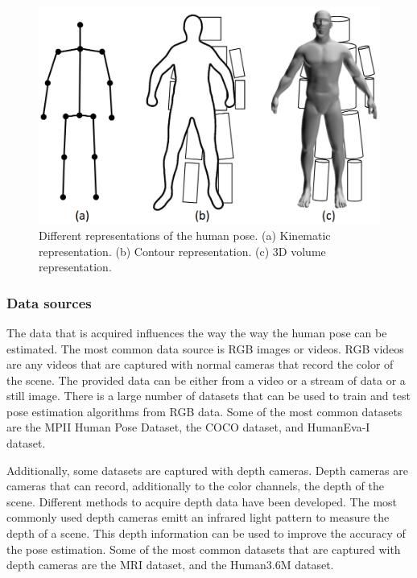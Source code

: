 \begin{figure}
    \centering
    \includegraphics[width=0.8\linewidth]{figures/HPE/PoseRepresentation.png}
    \caption[Different representations of the human pose]{Different representations of the human pose. (a) Kinematic representation. (b) Contour representation. (c) 3D volume representation. \cite{HPESurveyOriginal}}
    \label{fig:pose_representation}
\end{figure}

\subsubsection{Data sources}

The data that is acquired influences the way the way the human pose can be estimated. The most common data source is RGB images or videos. RGB videos are any videos that are captured with normal cameras that record the color of the scene. The provided data can be either from a video or a stream of data or a still image. There is a large number of datasets that can be used to train and test pose estimation algorithms from RGB data. Some of the most common datasets are the MPII Human Pose Dataset\cite{MPII}, the COCO dataset\cite{Coco}, and HumanEva-I dataset\cite{HumanEva}.

Additionally, some datasets are captured with depth cameras. Depth cameras are cameras that can record, additionally to the color channels, the depth of the scene. Different methods to acquire depth data have been developed. The most commonly used depth cameras emitt an infrared light pattern to measure the depth of a scene. This depth information can be used to improve the accuracy of the pose estimation. Some of the most common datasets that are captured with depth cameras are the MRI dataset\cite{mRI}, and the Human3.6M dataset\cite{h36m_pami}.

